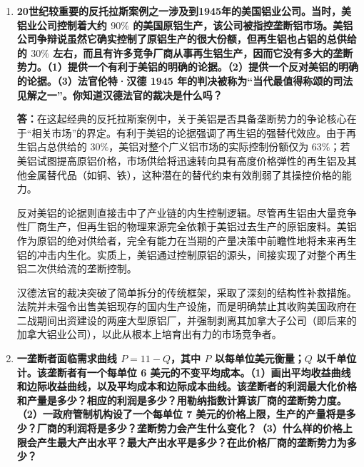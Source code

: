 \begin{enumerate}[label=\textbf{\arabic*.}, leftmargin=*]
\begin{center}
		\end{center}
		
		\item \textbf{20世纪较重要的反托拉斯案例之一涉及到1945年的美国铝业公司。当时，美铝业公司控制着大约 $90\%$ 的美国原铝生产，该公司被指控垄断铝市场。美铝公司争辩说虽然它确实控制了原铝生产的很大份额，但再生铝也占铝的总供给的 $30\%$ 左右，而且有许多竞争厂商从事再生铝生产，因而它没有多大的垄断势力。（1）提供一个有利于美铝的明确的论据。（2）提供一个反对美铝的明确的论据。（3）法官伦特·汉德 1945 年的判决被称为“当代最值得称颂的司法见解之一”。你知道汉德法官的裁决是什么吗？}
		
		\textbf{答：}在这起经典的反托拉斯案例中，关于美铝是否具备垄断势力的争论核心在于“相关市场”的界定。有利于美铝的论据强调了再生铝的强替代效应。由于再生铝占总供给的 $30\%$，美铝对整个广义铝市场的实际控制份额仅为 $63\%$；若美铝试图提高原铝价格，市场供给将迅速转向具有高度价格弹性的再生铝及其他金属替代品（如铜、铁），这种潜在的替代约束有效削弱了其操控价格的能力。
		
		反对美铝的论据则直接击中了产业链的内生控制逻辑。尽管再生铝由大量竞争性厂商生产，但再生铝的物理来源完全依赖于美铝过去生产的原铝废料。美铝作为原铝的绝对供给者，完全有能力在当期的产量决策中前瞻性地将未来再生铝的冲击内生化。实质上，美铝通过控制原铝的源头，间接实现了对整个再生铝二次供给流的垄断控制。
		
		汉德法官的裁决突破了简单拆分的传统框架，采取了深刻的结构性补救措施。法院并未强令出售美铝现存的国内生产设施，而是明确禁止其收购美国政府在二战期间出资建设的两座大型原铝厂，并强制剥离其加拿大子公司（即后来的加拿大铝业公司），以此从根本上培育出有力的市场竞争者。
		
		\newpage
		\item \textbf{一垄断者面临需求曲线 $P = 11 - Q$，其中 $P$ 以每单位美元衡量；$Q$ 以千单位计。该垄断者有一个每单位 6 美元的不变平均成本。（1）画出平均收益曲线和边际收益曲线，以及平均成本和边际成本曲线。该垄断者的利润最大化价格和产量是多少？相应的利润是多少？用勒纳指数计算该厂商的垄断势力度。（2）一政府管制机构设了一个每单位 7 美元的价格上限，生产的产量将是多少？厂商的利润将是多少？垄断势力会产生什么变化？（3）什么样的价格上限会产生最大产出水平？最大产出水平是多少？在此价格厂商的垄断势力为多少？}
		

\end{enumerate}
